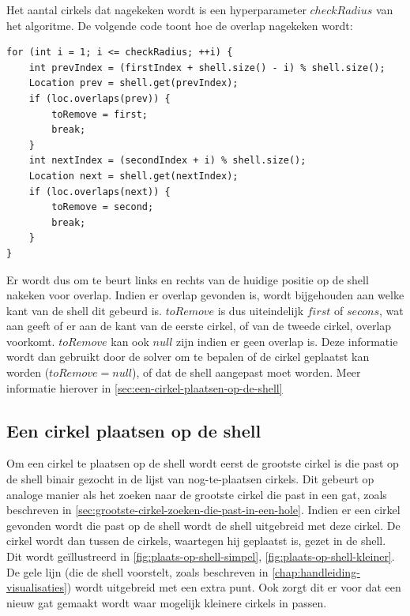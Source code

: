 \documentclass[12pt,a4paper,oneside]{book}
\begin{document}
Het aantal cirkels dat nagekeken wordt is een hyperparameter $checkRadius$ van het algoritme.
De volgende code toont hoe de overlap nagekeken wordt:

\begin{lstlisting}
for (int i = 1; i <= checkRadius; ++i) {
	int prevIndex = (firstIndex + shell.size() - i) % shell.size();
	Location prev = shell.get(prevIndex);
	if (loc.overlaps(prev)) {
		toRemove = first;
		break;
	}
	int nextIndex = (secondIndex + i) % shell.size();
	Location next = shell.get(nextIndex);
	if (loc.overlaps(next)) {
		toRemove = second;
		break;
	}
}
\end{lstlisting}

Er wordt dus om te beurt links en rechts van de huidige positie op de shell nakeken voor overlap.
Indien er overlap gevonden is, wordt bijgehouden aan welke kant van de shell dit gebeurd is.
$toRemove$ is dus uiteindelijk $first$ of $secons$, wat aan geeft of er aan de kant van de eerste cirkel, of van de tweede cirkel, overlap voorkomt.
$toRemove$ kan ook $null$ zijn indien er geen overlap is.
Deze informatie wordt dan gebruikt door de solver om te bepalen of de cirkel geplaatst kan worden ($toRemove = null$), of dat de shell aangepast moet worden.
Meer informatie hierover in \autoref{sec:een-cirkel-plaatsen-op-de-shell}

\subsection{Een cirkel plaatsen op de shell} \label{sec:een-cirkel-plaatsen-op-de-shell}

Om een cirkel te plaatsen op de shell wordt eerst de grootste cirkel is die past op de shell binair gezocht in de lijst van nog-te-plaatsen cirkels.
Dit gebeurt op analoge manier als het zoeken naar de grootste cirkel die past in een gat, zoals beschreven in \autoref{sec:grootste-cirkel-zoeken-die-past-in-een-hole}.
Indien er een cirkel gevonden wordt die past op de shell wordt de shell uitgebreid met deze cirkel.
De cirkel wordt dan tussen de cirkels, waartegen hij geplaatst is, gezet in de shell.
Dit wordt geïllustreerd in \autoref{fig:plaats-op-shell-simpel}, \autoref{fig:plaats-op-shell-kleiner}.
De gele lijn (die de shell voorstelt, zoals beschreven in \autoref{chap:handleiding-visualisaties}) wordt uitgebreid met een extra punt.
Ook zorgt dit er voor dat een nieuw gat gemaakt wordt waar mogelijk kleinere cirkels in passen.
\end{document}

